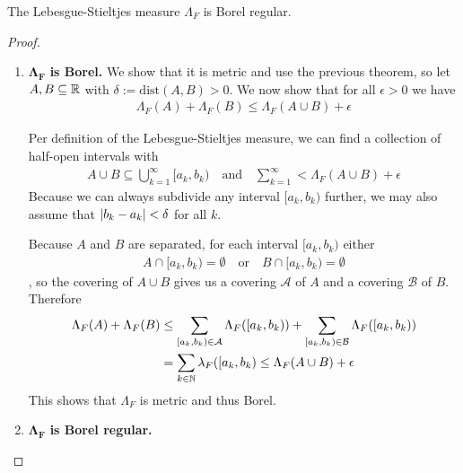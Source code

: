 \begin{thm}[] \label{thm:stieltjes-is-borel-regular}
  The Lebesgue-Stieltjes measure $\Lambda_F$ is Borel regular.
\end{thm}
\begin{proof}
  \begin{enumerate}[{(}i{)}]
    \item $\bm{\Lambda_F}$ \textbf{is Borel.}
  We show that it is metric and use the previous theorem, so let $A,B \subseteq \mathbb{R}$ with $\delta := \text{dist}(A,B) > 0$.
  We now show that for all $\epsilon > 0$ we have
  \begin{align*}
    \Lambda_F(A) + \Lambda_F(B) \leq \Lambda_F(A \cup B) + \epsilon
  \end{align*}

  Per definition of the Lebesgue-Stieltjes measure, we can find a collection of half-open intervals with
  \begin{align*}
    A \cup B \subseteq \bigcup_{k=1}^{\infty} [a_k,b_k) \quad \text{and} \quad \sum_{k=1}^{\infty} < \Lambda_F(A \cup B) + \epsilon
  \end{align*}
  Because we can always subdivide any interval $[a_k,b_k)$ further, we may also assume that $\vert b_k - a_k\vert < \delta$ for all $k$.

  Because $A$ and $B$ are separated, for each interval $[a_k,b_k)$ either
  \begin{align*}
    A \cap  [a_k,b_k) = \emptyset \quad \text{or} \quad 
    B \cap  [a_k,b_k) = \emptyset 
  \end{align*}
  , so the covering of $A \cup B$ gives us a covering $\mathcal{A}$ of $A$ and a covering $\mathcal{B}$ of $B$.
  Therefore
  \begin{align*}
    \Lambda_F(A) + \Lambda_F(B) 
    &\leq 
    \sum_{[a_k,b_k) \in \mathcal{A}} \Lambda_F([a_k,b_k))
    +
    \sum_{[a_k,b_k) \in \mathcal{B}} \Lambda_F([a_k,b_k))\\
    &= \sum_{k\in \N} \lambda_F([a_k,b_k) \leq \Lambda_F(A \cup B) + \epsilon
  \end{align*}
  This shows that $\Lambda_F$ is metric and thus Borel.

  \item $\bm{\Lambda_F}$ \textbf{is Borel regular.}


\end{enumerate}
\end{proof}
